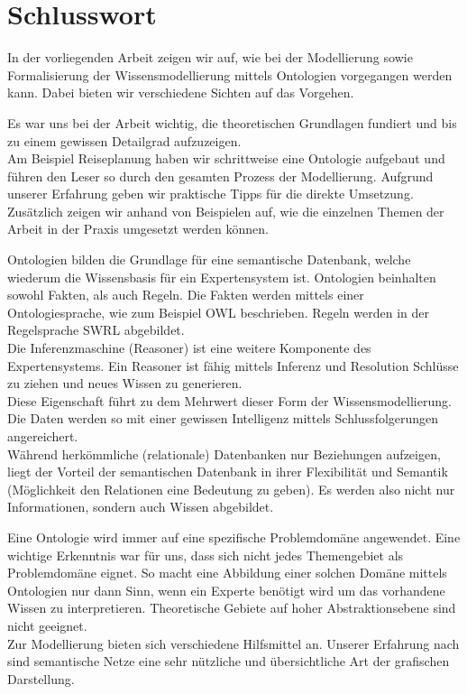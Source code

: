 \chapter{Schlusswort}
\label{chap:schlusswort}

In der vorliegenden Arbeit zeigen wir auf, wie bei der Modellierung sowie Formalisierung der Wissensmodellierung mittels Ontologien vorgegangen werden kann. Dabei bieten wir verschiedene Sichten auf das Vorgehen.

Es war uns bei der Arbeit wichtig, die theoretischen Grundlagen fundiert und bis zu einem gewissen Detailgrad aufzuzeigen. \\
Am Beispiel Reiseplanung haben wir schrittweise eine Ontologie aufgebaut und führen den Leser so durch den gesamten Prozess der Modellierung. Aufgrund unserer Erfahrung geben wir praktische Tipps für die direkte Umsetzung. Zusätzlich zeigen wir anhand von Beispielen auf, wie die einzelnen Themen der Arbeit in der Praxis umgesetzt werden können.

Ontologien bilden die Grundlage für eine semantische Datenbank, welche wiederum die Wissensbasis für ein Expertensystem ist. Ontologien beinhalten sowohl Fakten, als auch Regeln. Die Fakten werden mittels einer Ontologiesprache, wie zum Beispiel OWL beschrieben. Regeln werden in der Regelsprache SWRL abgebildet.\\
Die Inferenzmaschine (Reasoner) ist eine weitere Komponente des Expertensystems. Ein Reasoner ist fähig mittels Inferenz und Resolution Schlüsse zu ziehen und neues Wissen zu generieren.\\
Diese Eigenschaft führt zu dem Mehrwert dieser Form der Wissensmodellierung. Die Daten werden so mit einer gewissen Intelligenz mittels Schlussfolgerungen angereichert.\\
Während herkömmliche (relationale) Datenbanken nur Beziehungen aufzeigen, liegt der Vorteil der semantischen Datenbank in ihrer Flexibilität und Semantik (Möglichkeit den Relationen eine Bedeutung zu geben). Es werden also nicht nur Informationen, sondern auch Wissen abgebildet.

Eine Ontologie wird immer auf eine spezifische Problemdomäne angewendet. Eine wichtige Erkenntnis war für uns, dass sich nicht jedes Themengebiet als Problemdomäne eignet. So macht eine Abbildung einer solchen Domäne mittels Ontologien nur dann Sinn, wenn ein Experte benötigt wird um das vorhandene Wissen zu interpretieren.
Theoretische Gebiete auf hoher Abstraktionsebene sind nicht geeignet.\\
Zur Modellierung bieten sich verschiedene Hilfsmittel an. Unserer Erfahrung nach sind semantische Netze eine sehr nützliche und übersichtliche Art der grafischen Darstellung.

